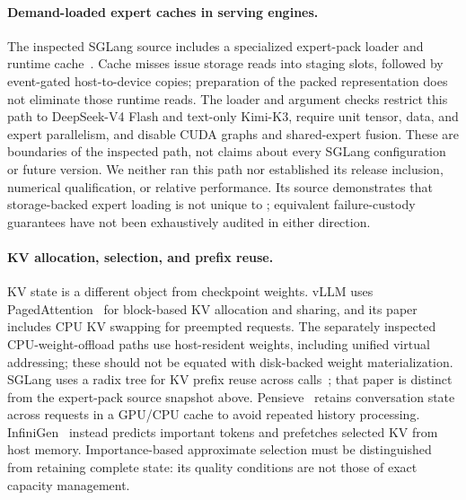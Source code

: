 \paragraph{Demand-loaded expert caches in serving engines.}
The inspected SGLang source includes a specialized expert-pack loader and
runtime cache~\cite{sglang2026expertpack}. Cache misses issue storage reads into
staging slots, followed by event-gated host-to-device copies; preparation of
the packed representation does not eliminate those runtime reads. The loader
and argument checks restrict this path to DeepSeek-V4 Flash and text-only
Kimi-K3, require unit tensor, data, and expert parallelism, and disable CUDA
graphs and shared-expert fusion. These are boundaries of the inspected path,
not claims about every SGLang configuration or future version. We neither ran
this path nor established its release inclusion, numerical qualification, or
relative performance. Its source demonstrates that storage-backed expert
loading is not unique to \system{}; equivalent failure-custody guarantees
have not been exhaustively audited in either direction.

\paragraph{KV allocation, selection, and prefix reuse.}
KV state is a different object from checkpoint weights.
vLLM uses PagedAttention~\cite{kwon2023pagedattention} for block-based KV
allocation and sharing, and its paper includes CPU KV swapping for preempted
requests. The separately inspected CPU-weight-offload paths use host-resident
weights, including unified virtual addressing; these should not be equated
with disk-backed weight materialization. SGLang uses a radix tree for KV
prefix reuse across calls~\cite{zheng2024sglang}; that paper is distinct from
the expert-pack source snapshot above.
Pensieve~\cite{yu2025pensieve} retains conversation state across requests in
a GPU/CPU cache to avoid repeated history processing.
InfiniGen~\cite{lee2024infinigen} instead predicts important tokens and
prefetches selected KV from host memory. Importance-based approximate
selection must be distinguished from retaining complete state: its quality
conditions are not those of exact capacity management.

